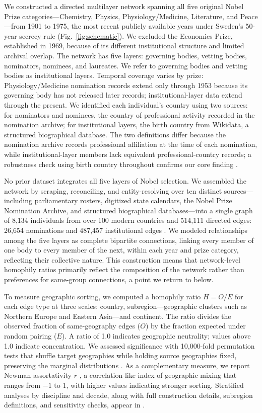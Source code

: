 \documentclass[12pt]{article}
\begin{document}
We constructed a directed multilayer network spanning all five original Nobel Prize categories---Chemistry, Physics, Physiology/Medicine, Literature, and Peace---from 1901 to 1975, the most recent publicly available years under Sweden's 50-year secrecy rule (Fig.~\ref{fig:schematic}). We excluded the Economics Prize, established in 1969, because of its different institutional structure and limited archival overlap. The network has five layers: governing bodies, vetting bodies, nominators, nominees, and laureates. We refer to governing bodies and vetting bodies as institutional layers. Temporal coverage varies by prize: Physiology/Medicine nomination records extend only through 1953 because its governing body has not released later records; institutional-layer data extend through the present. We identified each individual's country using two sources: for nominators and nominees, the country of professional activity recorded in the nomination archive; for institutional layers, the birth country from Wikidata, a structured biographical database. The two definitions differ because the nomination archive records professional affiliation at the time of each nomination, while institutional-layer members lack equivalent professional-country records; a robustness check using birth country throughout confirms our core finding \cite{methods}.

No prior dataset integrates all five layers of Nobel selection. We assembled the network by scraping, reconciling, and entity-resolving over ten distinct sources---including parliamentary rosters, digitized state calendars, the Nobel Prize Nomination Archive, and structured biographical databases---into a single graph of 8,134 individuals from over 100 modern countries and 514,111 directed edges: 26,654 nominations and 487,457 institutional edges \cite{methods}.
We modeled relationships among the five layers as complete bipartite connections, linking every member of one body to every member of the next, within each year and prize category, reflecting their collective nature. This construction means that network-level homophily ratios primarily reflect the composition of the network rather than preferences for same-group connections, a point we return to below. 

To measure geographic sorting, we computed a homophily ratio $H = O/E$ for each edge type at three scales: country, subregion---geographic clusters such as Northern Europe and Eastern Asia---and continent. The ratio divides the observed fraction of same-geography edges ($O$) by the fraction expected under random pairing ($E$). A ratio of 1.0 indicates geographic neutrality; values above 1.0 indicate concentration. We assessed significance with 10,000-fold permutation tests that shuffle target geographies while holding source geographies fixed, preserving the marginal distributions \cite{methods}. As a complementary measure, we report Newman assortativity $r$ \cite{New2003}, a correlation-like index of geographic mixing that ranges from $-1$ to $1$, with higher values indicating stronger sorting. Stratified analyses by discipline and decade, along with full construction details, subregion definitions, and sensitivity checks, appear in \cite{methods}.
\end{document}
